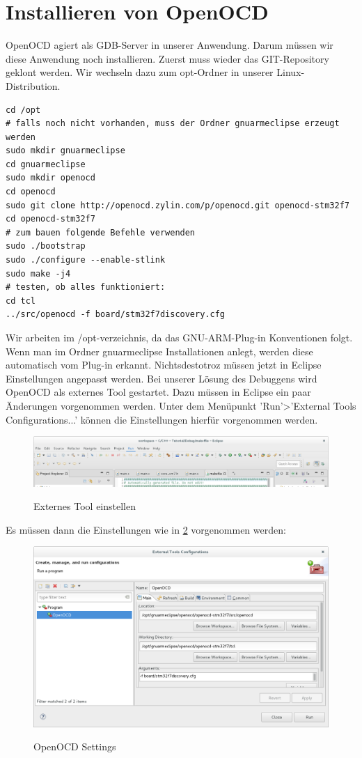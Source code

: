 \section{Installieren von OpenOCD}
OpenOCD agiert als GDB-Server in unserer Anwendung. Darum müssen wir diese Anwendung noch installieren.
Zuerst muss wieder das GIT-Repository geklont werden. Wir wechseln dazu zum opt-Ordner in unserer Linux-Distribution.
\begin{lstlisting}
cd /opt
# falls noch nicht vorhanden, muss der Ordner gnuarmeclipse erzeugt werden
sudo mkdir gnuarmeclipse
cd gnuarmeclipse
sudo mkdir openocd
cd openocd
sudo git clone http://openocd.zylin.com/p/openocd.git openocd-stm32f7
cd openocd-stm32f7
# zum bauen folgende Befehle verwenden
sudo ./bootstrap
sudo ./configure --enable-stlink
sudo make -j4
# testen, ob alles funktioniert:
cd tcl
../src/openocd -f board/stm32f7discovery.cfg
\end{lstlisting}
Wir arbeiten im /opt-verzeichnis, da das GNU-ARM-Plug-in Konventionen folgt. Wenn man im Ordner gnuarmeclipse Installationen anlegt, werden diese automatisch vom Plug-in erkannt.
Nichtsdestotroz müssen jetzt in Eclipse Einstellungen angepasst werden.
Bei unserer Lösung des Debuggens wird OpenOCD als externes Tool gestartet. Dazu müssen in Eclipse ein paar Änderungen vorgenommen werden. Unter dem Menüpunkt 'Run'>'External Tools Configurations...' können die Einstellungen hierfür vorgenommen werden.
\begin{figure}[h]
\begin{center}
\includegraphics[width=12cm]{grafiken/debugger/RunConfiguration1.png}
\label{eclipse_external_tool_setup}
\caption{Externes Tool einstellen}
\end{center}
\end{figure}
Es müssen dann die Einstellungen wie in \ref{ecplipse_OpenOCD_setting1} vorgenommen werden: 
\begin{figure}[h]
\begin{center}
\includegraphics[width=12cm]{grafiken/debugger/OpenOCDsetting.png}
\label{ecplipse_OpenOCD_setting1}
\caption{OpenOCD Settings}
\end{center}
\end{figure}
\newpage
